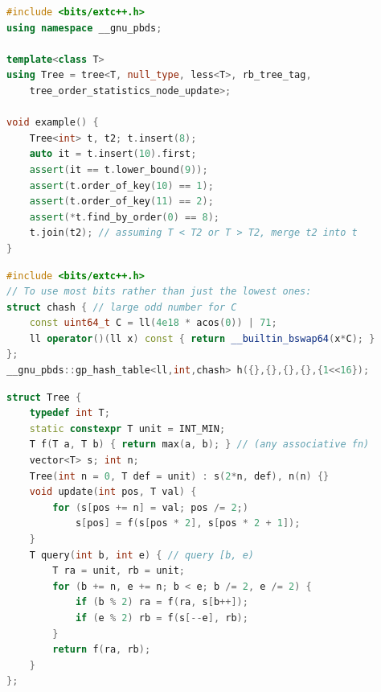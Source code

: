 \begin{multicols}{\Columns}
\begin{lstlisting}[language=C++]
#include <bits/extc++.h>
using namespace __gnu_pbds;

template<class T>
using Tree = tree<T, null_type, less<T>, rb_tree_tag,
    tree_order_statistics_node_update>;

void example() {
	Tree<int> t, t2; t.insert(8);
	auto it = t.insert(10).first;
	assert(it == t.lower_bound(9));
	assert(t.order_of_key(10) == 1);
	assert(t.order_of_key(11) == 2);
	assert(*t.find_by_order(0) == 8);
	t.join(t2); // assuming T < T2 or T > T2, merge t2 into t
}
\end{lstlisting}

\begin{lstlisting}[language=C++]
#include <bits/extc++.h>
// To use most bits rather than just the lowest ones:
struct chash { // large odd number for C
	const uint64_t C = ll(4e18 * acos(0)) | 71;
	ll operator()(ll x) const { return __builtin_bswap64(x*C); }
};
__gnu_pbds::gp_hash_table<ll,int,chash> h({},{},{},{},{1<<16});
\end{lstlisting}

\begin{lstlisting}[language=C++]
struct Tree {
	typedef int T;
	static constexpr T unit = INT_MIN;
	T f(T a, T b) { return max(a, b); } // (any associative fn)
	vector<T> s; int n;
	Tree(int n = 0, T def = unit) : s(2*n, def), n(n) {}
	void update(int pos, T val) {
		for (s[pos += n] = val; pos /= 2;)
			s[pos] = f(s[pos * 2], s[pos * 2 + 1]);
	}
	T query(int b, int e) { // query [b, e)
		T ra = unit, rb = unit;
		for (b += n, e += n; b < e; b /= 2, e /= 2) {
			if (b % 2) ra = f(ra, s[b++]);
			if (e % 2) rb = f(s[--e], rb);
		}
		return f(ra, rb);
	}
};
\end{lstlisting}


\end{multicols}
